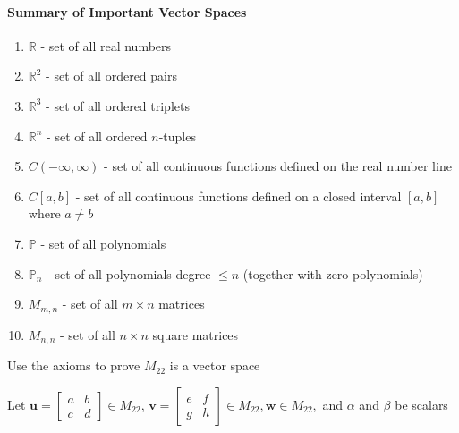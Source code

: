 \documentclass{report}
\begin{document}
\paragraph{Summary of Important Vector Spaces} 
\begin{enumerate}
    \item $\mathbb{R}$ - set of all real numbers
    \item $\mathbb{R}^2$ - set of all ordered pairs
    \item $\mathbb{R}^3$ - set of all ordered triplets
    \item $\mathbb{R}^n$ - set of all ordered $n$-tuples
    \item $C(-\infty, \infty)$ - set of all continuous functions defined on the real number line
    \item $C[a,b]$ - set of all continuous functions defined on a closed interval $[a,b]$ where $a \ne b$
    \item $\mathbb{P}$ - set of all polynomials
    \item $\mathbb{P}_n$ - set of all polynomials degree $\le n$ (together with zero polynomials)
    \item $M_{m,n}$ - set of all $m \times n$ matrices
    \item $M_{n,n}$ - set of all $n \times n$ square matrices
\end{enumerate}


\begin{tcolorbox}[colframe = lightred, title = Example Proof 1]

 Use the axioms to prove $M_{22}$ is a vector space
 
 \end{tcolorbox}

Let $\bm{u} =
\begin{bmatrix}
    a & b \\
    c & d
\end{bmatrix} 
\in M_{22}$, $\bm{v} = 
\begin{bmatrix}
    e & f \\
    g & h
\end{bmatrix}
\in M_{22}, \bm{w} \in M_{22},$ and $\alpha$ and $\beta$ be scalars
\end{document}
